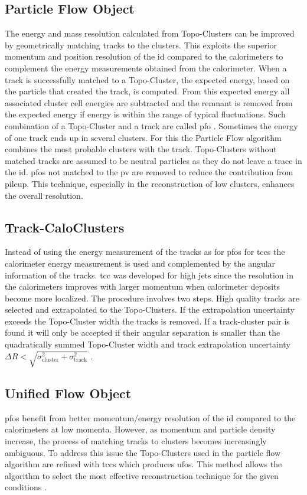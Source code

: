 \subsection{Particle Flow Object}\label{sec:particle_flow}
The energy and mass resolution calculated from Topo-Clusters can be improved by geometrically matching tracks to the clusters. This exploits the superior momentum and position resolution of the \ac{id} compared to the calorimeters to complement the energy measurements obtained from the calorimeter. When a track is successfully matched to a Topo-Cluster, the expected energy, based on the particle that created the track, is computed. From this expected energy all associated cluster cell energies are subtracted and the remnant is removed from the expected energy if energy is within the range of typical fluctuations. Such combination of a Topo-Cluster and a track are called \ac{pfo} \citep{aaboud2017jet}. Sometimes the energy of one track ends up in several clusters. For this the Particle Flow algorithm combines the most probable clusters with the track. Topo-Clusters without matched tracks are assumed to be neutral particles as they do not leave a trace in the \ac{id}. \acp{pfo} not matched to the \ac{pv} are removed to reduce the contribution from pileup.  This technique, especially in the reconstruction of low \pt clusters, enhances the overall resolution.

\subsection{Track-CaloClusters}
Instead of using the energy measurement of the tracks as for \acp{pfo} for \acp{tcc} the calorimeter energy measurement is used and complemented by the angular information of the tracks. \ac{tcc} was developed for high \pt jets since the resolution in the calorimeters improves with larger momentum when calorimeter deposits become more localized. The procedure involves two steps. High quality tracks are selected and extrapolated to the Topo-Clusters. If the extrapolation uncertainty exceeds the Topo-Cluster width the tracks is removed. If a track-cluster pair is found it will only be accepted if their angular separation is smaller than the quadratically summed Topo-Cluster width and track extrapolation uncertainty $\Delta R < \sqrt{\sigma_\text{cluster}^2+\sigma_\text{track}^2}$ \citep{ATL-PHYS-PUB-2017-015}.

\subsection{Unified Flow Object}
\acp{pfo} benefit from better momentum/energy resolution of the \ac{id} compared to the calorimeters at low momenta. However, as momentum and particle density increase, the process of matching tracks to clusters becomes increasingly ambiguous. To address this issue the Topo-Clusters used in the particle flow algorithm are refined with \acp{tcc} which produces \acp{ufo}. This method allows the algorithm to select the most effective reconstruction technique for the given conditions \citep{atlas2021optimisation,ATL-PHYS-PUB-2022-038}.



